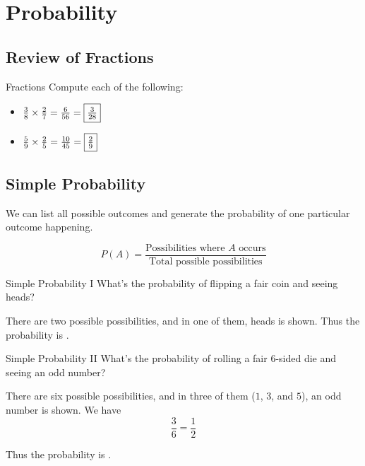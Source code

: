 \documentclass[a4paper,10pt]{report}
\begin{document}
\chapter{Probability}

\section{Review of Fractions}

\begin{problem}{Fractions}
 Compute each of the following:

 \begin{itemize}
  \item \(
         \frac{3}{8} \times \frac{2}{7} = \frac{6}{56} = \Ans{\frac{3}{28}}
        \)
  \item \(
  \frac{5}{9} \times \frac{2}{5} = \frac{10}{45} = \Ans{\frac{2}{9}}
  \)
 \end{itemize}
\end{problem}

\section{Simple Probability}

We can list all possible outcomes and generate the probability of one particular
outcome happening.

\begin{equation}
 P(A) = \frac{\text{Possibilities where $A$ occurs}}
 {\text{Total possible possibilities}}
\end{equation}


\begin{problem}{Simple Probability I}
 What's the probability of flipping a fair coin and seeing heads?

 \begin{solution}
  There are two possible possibilities, and in one of them, heads is shown. Thus
  the probability is .
 \end{solution}
\end{problem}

\begin{problem}{Simple Probability II}
 What's the probability of rolling a fair $6$-sided die and seeing an odd
 number?

 \begin{solution}
  There are six possible possibilities, and in three of them ($1$, $3$, and
  $5$), an odd number is shown. We have \[
   \frac{3}{6} = \frac{1}{2}
  \]

  Thus the probability is .
 \end{solution}
\end{problem}
\end{document}
